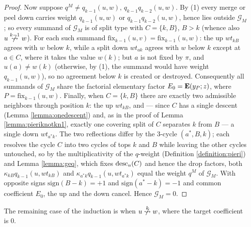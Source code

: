 \documentclass{amsart}
\theoremstyle{definition}
\theoremstyle{remark}
\numberwithin{equation}{section}
\newcommand{\fx}{\mathrm{fix}}
\begin{document}
\begin{proof}
Now suppose $q^M\neq q_{k-1}(u,w),\,q_{k-1}q_{k-2}(u,w)$. By (1) every merge or peel down carries weight $q_{k-1}(u,w)$ or $q_{k-1}q_{k-2}(u,w)$, hence lies outside $\mathcal{G}_M$; so every summand of $\mathcal{G}_M$ is of split type with $C=\{k,B\}$, $B>k$ (whence also $u\ntom{k-1}w$). For each such summand $\fx_{{k-1}}(u,v)=\fx_{{k-1}}(u,w)$: the up $wt_{kB}$ agrees with $w$ below $k$, while a split down $wt_{ak}$ agrees with $w$ below $k$ except at $a\in C$, where it takes the value $w(k)$; but $a$ is not fixed by $\pi$, and $u(a)\neq w(k)$ (otherwise, by (1), the summand would have weight $q_{k-1}(u,w)$), so no agreement below $k$ is created or destroyed. Consequently all summands of $\mathcal{G}_M$ share the factorial elementary factor $E_0=\mathbf{E}(y_{P};z)$, where $P=\fx_{{k-1}}(u,w)$. Finally, when $C=\{k,B\}$ there are exactly two admissible neighbors through position $k$: the up $wt_{kB}$, and --- since $C$ has a single descent (Lemma \ref{lemma:onedescent}) and, as in the proof of Lemma \ref{lemma:pieriknotkn1}, exactly one covering split of $C$ separates $k$ from $B$ --- a single down $wt_{a^\ast k}$. The two reflections differ by the $3$-cycle $(a^\ast,B,k)$; each resolves the cycle $C$ into two cycles of tops $k$ and $B$ while leaving the other cycles untouched, so by the multiplicativity of the $q$-weight (Definition \ref{definition:pieri}) and Lemma \ref{lemma:geq}, which fixes $\mathrm{desc}_u(C)$ and hence the drop factors, both $\kappa_{kB}q_{k-1}(u,wt_{kB})$ and $\kappa_{a^\ast k}q_{k-1}(u,wt_{a^\ast k})$ equal the weight $q^M$ of $\mathcal{G}_M$. With opposite signs $\mathrm{sign}(B-k)=+1$ and $\mathrm{sign}(a^\ast-k)=-1$ and common coefficient $E_0$, the up and the down cancel. Hence $\mathcal{G}_M=0$.
\end{proof}

The remaining case of the induction is when $u\ntom{k}w$, where the target coefficient is $0$.
\end{document}
